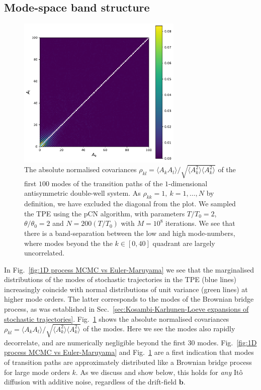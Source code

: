 \subsection{Mode-space band structure} \label{sec:Mode-space band structure}

\begin{figure}[t]
\includegraphics[width=0.7\textwidth]{figs_part1/mcmc/1D_process_covariances}
\centering \caption{The absolute normalised covariances $\rho_{kl} = \langle A_k A_l \rangle / \sqrt{ \langle A_k^2 \rangle \langle A_k^2 \rangle }$ of the first $100$ modes of the transition paths of the $1$-dimensional antisymmetric double-well system. As $\rho_{kk} = 1,\ k=1,\dots,N$ by definition, we have excluded the diagonal from the plot. We sampled the TPE using the pCN algorithm, with parameters $T/T_0 = 2$, $\theta/\theta_0 = 2$ and $N = 200(T/T_0)$ with $M=10^8$ iterations. We see that there is a band-separation between the low and high mode-numbers, where modes beyond the the $k \in [0, 40]$ quadrant are largely uncorrelated.}
\label{fig:1D process covariance} 
\end{figure}

In Fig.~\ref{fig:1D process MCMC vs Euler-Maruyama} we see that the marginalised distributions of the modes of stochastic trajectories in the TPE (blue lines) increasingly coincide with normal distributions of unit variance (green lines) at higher mode orders. The latter corresponds to the modes of the Brownian bridge process, as was established in Sec.~\ref{sec:Kosambi-Karhunen-Loeve expansions of stochastic trajectories}. Fig.~\ref{fig:1D process covariance} shows the absolute normalised covariances $\rho_{kl} = \langle A_k A_l \rangle / \sqrt{ \langle A_k^2 \rangle \langle A_k^2 \rangle }$ of the modes. Here we see the modes also rapidly decorrelate, and are numerically negligible beyond the first $30$ modes. Fig.~\ref{fig:1D process MCMC vs Euler-Maruyama} and Fig.~\ref{fig:1D process covariance} are a first indication that modes of transition paths are approximately distributed like a Brownian bridge process for large mode orders $k$. As we discuss and show below, this holds for \textit{any} It\^{o} diffusion with additive noise, regardless of the drift-field $\mathbf{b}$.

